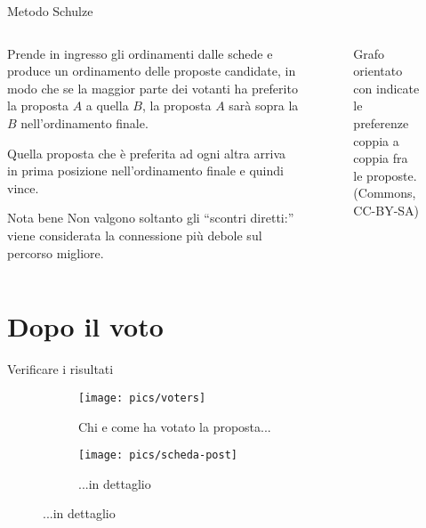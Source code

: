 \begin{frame}{Metodo Schulze}
\begin{columns}
\begin{column}{.666\textwidth}
Prende in ingresso gli ordinamenti dalle schede e produce un ordinamento delle proposte candidate, in modo che se la maggior parte dei votanti ha preferito la proposta $A$ a quella $B$, la proposta $A$ sarà sopra la $B$ nell'ordinamento finale.

\alert{Quella proposta che è preferita ad ogni altra arriva in prima posizione  nell'ordinamento finale e quindi vince}.

\begin{block}{Nota bene}
Non valgono soltanto gli ``scontri diretti:'' viene considerata la connessione più debole sul percorso migliore.
\end{block}
\end{column}
\begin{column}{.333\textwidth}
\begin{figure}[t]
\caption{Grafo orientato con indicate le preferenze coppia a coppia fra le proposte. (Commons, CC-BY-SA)}
\end{figure}
\end{column}
\end{columns}
\end{frame}

 \section{Dopo il voto}
\begin{frame}{Verificare i risultati}
\begin{figure}[hbp!]	\centering\begin{subfigure}[b]{.58\textwidth}
		\texttt{[image: pics/voters]}
		\caption{Chi e come ha votato la proposta...}
	\end{subfigure}
	\begin{subfigure}[b]{.34\textwidth}
		\texttt{[image: pics/scheda-post]}
		\caption{...in dettaglio}
	\end{subfigure}
\end{figure}
\end{frame}

